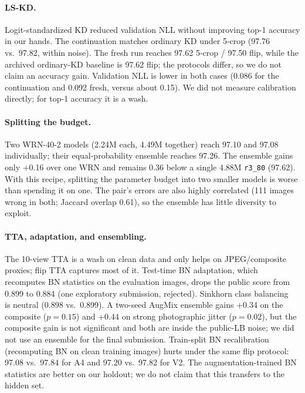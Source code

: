 \paragraph{LS-KD.}
Logit-standardized KD reduced validation NLL without improving top-1 accuracy in our hands. The continuation matches ordinary KD under 5-crop (97.76 vs.\ 97.82, within
noise). The fresh run reaches 97.62 5-crop / 97.50 flip, while the archived
ordinary-KD baseline is 97.62 flip; the protocols differ, so we do not claim an
accuracy gain. Validation NLL is lower in both cases (0.086 for the continuation
and 0.092 fresh, versus about 0.15). We did not measure calibration directly; for top-1 accuracy it is a wash.

\paragraph{Splitting the budget.}
Two WRN-40-2 models (2.24M each, 4.49M together) reach 97.10 and 97.08
individually; their equal-probability ensemble reaches 97.26. The ensemble gains
only +0.16 over one WRN and remains 0.36 below a single 4.88M \texttt{r3\_80}
(97.62). With this recipe, splitting the parameter budget into two smaller models
is worse than spending it on one. The pair's errors are also highly correlated
(111 images wrong in both; Jaccard overlap 0.61), so the ensemble has little
diversity to exploit.

\paragraph{TTA, adaptation, and ensembling.}
The 10-view TTA is a wash on clean data and only helps on JPEG/composite proxies;
flip TTA captures most of it. Test-time BN adaptation, which recomputes BN
statistics on the evaluation images, drops the public score from 0.899 to 0.884
(one exploratory submission, rejected).
Sinkhorn class balancing~\citep{cuturi2013sinkhorn} is neutral (0.898 vs.\ 0.899). A two-seed AugMix
ensemble gains +0.34 on the composite ($p=0.15$) and +0.44 on strong photographic
jitter ($p=0.02$), but the composite gain is not significant and both are inside
the public-LB noise; we did not use an ensemble for the final submission.
Train-split BN recalibration (recomputing BN on clean training images) hurts
under the same flip protocol: 97.08 vs.\ 97.84 for A4 and 97.20 vs.\ 97.82 for
V2. The augmentation-trained BN statistics are better on our holdout; we do not
claim that this transfers to the hidden set.

